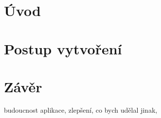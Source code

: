 \documentclass[czech,maturita,a4paper]{diploma}
\begin{document}
\MakeTitlePages
\chapter{Úvod}






\chapter{Postup vytvoření}




\chapter{Závěr}
  budoucnost aplikace, zlepšení, co bych udělal jinak, 

\printbibliography[title={Literatura}]

\end{document}
